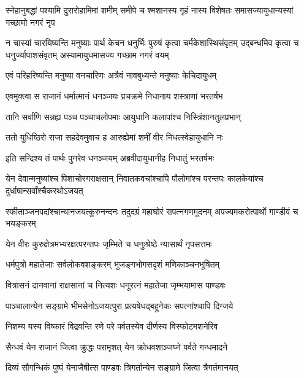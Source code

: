 \onelineshloka
{स्नेहानुबद्धां पश्यामि दुरारोहामिमां शमीम्}
\twolineshloka
{समीपे च श्मशानस्य गृहं नास्य विशेषतः}
{समासज्यायुधान्यस्यां गच्छामो नगरं नृप}


\onelineshloka
{न चास्यां चारयिष्यन्ति मनुष्याः पार्थ केचन}
\threelineshloka
{धनुर्भिः पुरुषं कृत्वा चर्मकेशास्थिसंवृतम्}
{उद्बन्धमिव कृत्वा च धनुर्ज्यापाशसंवृतम्}
{अस्यामायुधमासज्य गच्छाम नगरं वयम्}


\twolineshloka
{एवं परिहरिष्यन्ति मनुष्या वनचारिणः}
{अत्रैवं नावबुध्यन्ते मनुष्याः केचिदायुधम्}



\twolineshloka
{एवमुक्त्वा स राजानं धर्मात्मानं धनञ्जयः}
{प्रचक्रमे निधानाय शस्त्राणां भरतर्षभ}


\twolineshloka
{तानि सर्वाणि सन्नह्य पञ्च पञ्चाचलोपमाः}
{आयुधानि कलापांश्च निस्त्रिंशानतुलप्रभान्}


\twolineshloka
{ततो युधिष्ठिरो राजा सहदेवमुवाच ह}
{आरुह्येमां शमीं वीर निधत्स्वेहायुधानि नः}


\twolineshloka
{इति सन्दिश्य तं पार्थः पुनरेव धनञ्जयम्}
{अब्रवीदायुधानीह निधातुं भरतर्षभः}



\threelineshloka
{येन देवान्मनुष्यांश्च पिशाचोरगराक्षसान्}
{निवातकवचांश्चापि पौलोमांश्च परन्तपः}
{कालकेयांश्च दुर्धाषान्सर्वांश्चैकरथोऽजयत्}


\threelineshloka
{स्फीताञ्जनपदांश्चान्यानजयत्कुरुनन्दनः}
{तदुदग्रं महाघोरं सपत्नगणमूदनम्}
{अपज्यमकरोत्पार्थो गाण्डीवं च भयङ्करम्}


\twolineshloka
{येन वीरः कुरुक्षेत्रमभ्यरक्षत्परन्तपः}
{जृम्भिते च धनुःश्रेष्ठे न्यासार्थं नृपसत्तमः}


\twolineshloka
{धर्मपुत्रो महातेजाः सर्वलोकवशङ्करम्}
{भुजङ्गभोगसदृशं मणिकाञ्चनभूषितम्}


\twolineshloka
{वित्रासनं दानवानां राक्षसानां च नित्यशः}
{धनूरत्नं महातेजा जृम्भयामास पाण्डवः}


\twolineshloka
{पाञ्चालान्येन सङ्ग्रामे भीमसेनोऽजयत्पुरा}
{प्रत्यषेधद्बहूनेकः सपत्नांश्चापि दिग्जये}


\twolineshloka
{निशम्य यस्य विष्कारं विद्रवन्ति रणे परे}
{पर्वतस्येव दीर्णस्य विस्फोटमशनेरिव}


\twolineshloka
{सैन्धवं येन राजानं जित्वा क्रुद्धः परामृशत्}
{येन क्रोधवशाञ्जघ्ने पर्वते गन्धमादने}


\twolineshloka
{दिव्यं सौगन्धिकं पुष्पं येनाजैषीत्स पाण्डवः}
{त्रिगर्तान्येन सङ्ग्रामे जित्वा त्रैगर्तमानयत्}


